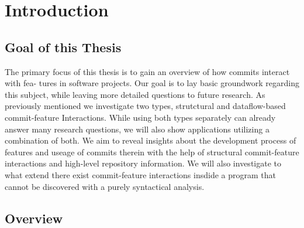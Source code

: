 \section*{Introduction}\label{ch:introduction}

\subsection*{Goal of this Thesis}

The primary focus of this thesis is to gain an overview of how commits interact with fea-
tures in software projects. Our goal is to lay basic groundwork regarding this
subject, while leaving more detailed questions to future research. As previously mentioned
we investigate two types, strutctural and dataflow-based commit-feature Interactions. While
using both types separately can already answer many research questions, we will also show
applications utilizing a combination of both.
We aim to reveal insights about the development process of features and useage of commits therein 
with the help of structural commit-feature interactions and high-level repository information.
We will also investigate to what extend there exist commit-feature interactions 
insdide a program that cannot be discovered with a purely syntactical analysis.

\subsection*{Overview}

